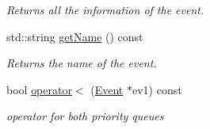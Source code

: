 \begin{DoxyCompactItemize}
\begin{DoxyCompactList}\small\item\em Returns all the information of the event. \end{DoxyCompactList}\item 
std\+::string \mbox{\hyperlink{classEvent_a36453ab5a21b660a61f2a0369e2689e8}{get\+Name}} () const
\begin{DoxyCompactList}\small\item\em Returns the name of the event. \end{DoxyCompactList}\item 
bool \mbox{\hyperlink{classEvent_a9a62a5f6528c63c84c30fa9edd50ddb1}{operator$<$}} (\mbox{\hyperlink{classEvent}{Event}} $\ast$ev1) const
\begin{DoxyCompactList}\small\item\em operator for both priority queues \end{DoxyCompactList}\end{DoxyCompactItemize}
